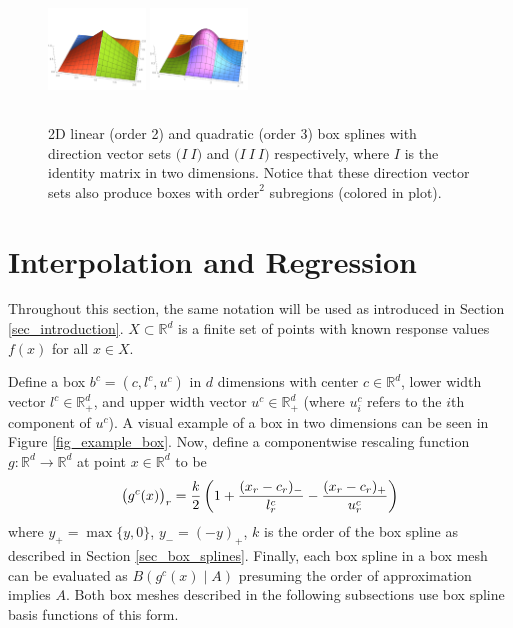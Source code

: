 \begin{figure}
  \vspace{-.5cm}
  \includegraphics[width=0.23\textwidth,height=3cm]{2D-linear.pdf}
  \includegraphics[width=0.23\textwidth,height=3cm]{2D-quadratic.pdf}
  \caption{2D linear (order 2) and quadratic (order 3) box splines with direction vector sets $\bigl( I \ I \bigr)$ and $\bigl( I \ I \ I \bigr)$ respectively, where $I$ is the identity matrix in two dimensions. Notice that these direction vector sets also produce boxes with $\text{order}^2$ subregions (colored in plot).
  \vspace{-0.1cm}}
  \label{fig_2D_boxes}
\end{figure}

\section{Interpolation and Regression}
\label{sec_mesh_construction}

Throughout this section, the same notation will be used as introduced in Section \ref{sec_introduction}. $X \subset \mathbb{R}^d$ is a finite set of points with known response values $f(x)$ for all $x \in X$.

Define a box $b^c = (c,l^c,u^c)$ in $d$ dimensions with center $c \in \mathbb{R}^d$, lower width vector $l^c \in \mathbb{R}^d_+$, and upper width vector $u^c \in \mathbb{R}^d_+$ (where $u^c_i$ refers to the $i$th component of $u^c$). A visual example of a box in two dimensions can be seen in Figure \ref{fig_example_box}. Now, define a componentwise rescaling function $g: \mathbb{R}^d \rightarrow \mathbb{R}^d$ at point $x \in \mathbb{R}^d$ to be
\begin{equation}
  \bigl(g^c(x)\bigr)_r = {k \over 2} \left( 1 + {(x_r - c_r)_- \over l^c_r} - {(x_r - c_r)_+ \over u^c_r} \right)
\end{equation}
where $y_+=\max\{y,0\}$, $y_-=(-y)_+$, $k$ is the order of the box spline as described in Section \ref{sec_box_splines}. Finally, each box spline in a box mesh can be evaluated as $B(g^c(x) \mid A)$ presuming the order of approximation implies $A$. Both box meshes described in the following subsections use box spline basis functions of this form.

